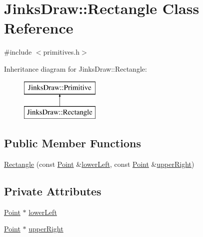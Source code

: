 \hypertarget{class_jinks_draw_1_1_rectangle}{}\section{Jinks\+Draw\+:\+:Rectangle Class Reference}
\label{class_jinks_draw_1_1_rectangle}


{\ttfamily \#include $<$primitives.\+h$>$}

Inheritance diagram for Jinks\+Draw\+:\+:Rectangle\+:\begin{figure}[H]
\begin{center}
\leavevmode
\includegraphics[height=2.000000cm]{class_jinks_draw_1_1_rectangle}
\end{center}
\end{figure}
\subsection*{Public Member Functions}
\begin{DoxyCompactItemize}
\item 
\mbox{\hyperlink{class_jinks_draw_1_1_rectangle_ab951aa25a7a67ddfa8b08391b11f784a}{Rectangle}} (const \mbox{\hyperlink{class_jinks_draw_1_1_point}{Point}} \&\mbox{\hyperlink{class_jinks_draw_1_1_rectangle_ad7cc79b8a62016b0e0129d28007e7b11}{lower\+Left}}, const \mbox{\hyperlink{class_jinks_draw_1_1_point}{Point}} \&\mbox{\hyperlink{class_jinks_draw_1_1_rectangle_a305c4ab3f01eb5ca5b77d9d43f4970c1}{upper\+Right}})
\end{DoxyCompactItemize}
\subsection*{Private Attributes}
\begin{DoxyCompactItemize}
\item 
\mbox{\hyperlink{class_jinks_draw_1_1_point}{Point}} $\ast$ \mbox{\hyperlink{class_jinks_draw_1_1_rectangle_ad7cc79b8a62016b0e0129d28007e7b11}{lower\+Left}}
\item 
\mbox{\hyperlink{class_jinks_draw_1_1_point}{Point}} $\ast$ \mbox{\hyperlink{class_jinks_draw_1_1_rectangle_a305c4ab3f01eb5ca5b77d9d43f4970c1}{upper\+Right}}
\end{DoxyCompactItemize}


